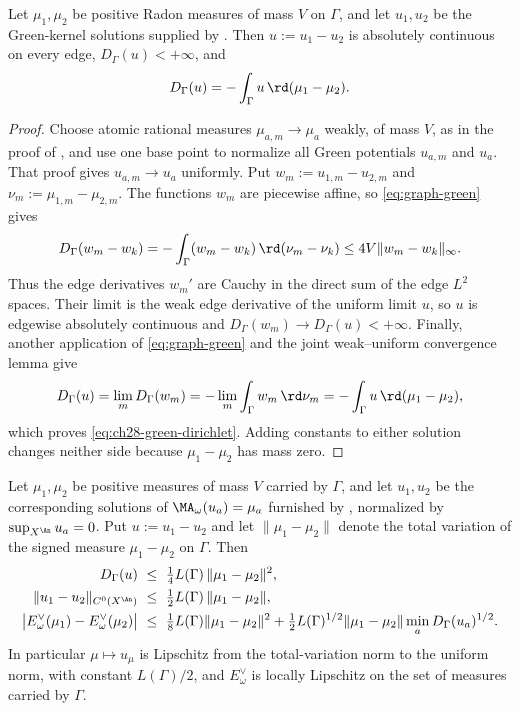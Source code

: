 \begin{lemma}
\label{lem:ch28-green-dirichlet}
Let $\mu_1,\mu_2$ be positive Radon measures of mass $V$ on $\Gamma$, and
let $u_1,u_2$ be the Green-kernel solutions supplied by
.  Then $u:=u_1-u_2$ is absolutely continuous
on every edge, $D_\Gamma(u)<+\infty$, and
\begin{equation}
\label{eq:ch28-green-dirichlet}
 D_\Gamma(u)=-\int_\Gamma u\,\rd(\mu_1-\mu_2).
\end{equation}
\end{lemma}

\begin{proof}
Choose atomic rational measures $\mu_{a,m}\to\mu_a$ weakly, of mass $V$,
as in the proof of , and use one base point to
normalize all Green potentials $u_{a,m}$ and $u_a$.  That proof gives
$u_{a,m}\to u_a$ uniformly.  Put $w_m:=u_{1,m}-u_{2,m}$ and
$\nu_m:=\mu_{1,m}-\mu_{2,m}$.  The functions $w_m$ are piecewise affine,
so \eqref{eq:graph-green} gives
\[
 D_\Gamma(w_m-w_k)
 =-\int_\Gamma(w_m-w_k)\,\rd(\nu_m-\nu_k)
 \leq4V\lVert w_m-w_k\rVert_\infty.
\]
Thus the edge derivatives $w_m'$ are Cauchy in the direct sum of the edge
$L^2$ spaces.  Their limit is the weak edge derivative of the uniform
limit $u$, so $u$ is edgewise absolutely continuous and
$D_\Gamma(w_m)\to D_\Gamma(u)<+\infty$.  Finally, another application of
\eqref{eq:graph-green} and the joint weak--uniform convergence lemma
 give
\[
 D_\Gamma(u)
 =\lim_mD_\Gamma(w_m)
 =-\lim_m\int_\Gamma w_m\,\rd\nu_m
 =-\int_\Gamma u\,\rd(\mu_1-\mu_2),
\]
which proves \eqref{eq:ch28-green-dirichlet}.  Adding constants to either
solution changes neither side because $\mu_1-\mu_2$ has mass zero.
\end{proof}

\begin{theorem}
\label{thm:ch28-curve-stability}
Let $\mu_1,\mu_2$ be positive measures of mass $V$ carried by
$\Gamma$, and let $u_1,u_2$ be the corresponding solutions of
$\MA_\omega(u_a)=\mu_a$ furnished by
, normalized by
$\sup_{X^{\An}}u_a=0$.  Put $u:=u_1-u_2$ and let
$\lVert\mu_1-\mu_2\rVert$ denote the total variation of the signed measure
$\mu_1-\mu_2$ on $\Gamma$.  Then
\begin{align}
\label{eq:ch28-curve-stability-dirichlet}
 D_\Gamma(u)&\ \leq\ \tfrac14L(\Gamma)\,
       \lVert\mu_1-\mu_2\rVert^2,\\
\label{eq:ch28-curve-stability-sup}
 \lVert u_1-u_2\rVert_{C^0(X^{\An})}
   &\ \leq\ \tfrac12L(\Gamma)\,
       \lVert\mu_1-\mu_2\rVert ,\\
\label{eq:ch28-curve-stability-dual}
 \bigl|E^\vee_\omega(\mu_1)-E^\vee_\omega(\mu_2)\bigr|
   &\ \leq\ \tfrac18L(\Gamma)\lVert\mu_1-\mu_2\rVert^2
      +\tfrac12L(\Gamma)^{1/2}\lVert\mu_1-\mu_2\rVert
        \min_aD_\Gamma(u_a)^{1/2}.
\end{align}
In particular $\mu\mapsto u_\mu$ is Lipschitz from the total-variation
norm to the uniform norm, with constant $L(\Gamma)/2$, and
$E^\vee_\omega$ is locally Lipschitz on the set of measures carried by
$\Gamma$.
\end{theorem}

